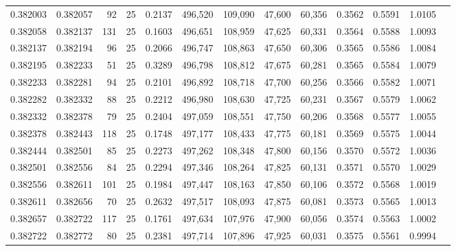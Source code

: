 \begin{tabular}{rrrrrrrrrrrrr}
0.382003 & 0.382057 &    92 &  25 &                                     0.2137 & 496,520 & 109,090 &  47,600 &  60,356 & 0.3562 & 0.5591 & 1.0105 \\
0.382058 & 0.382137 &   131 &  25 &                                     0.1603 & 496,651 & 108,959 &  47,625 &  60,331 & 0.3564 & 0.5588 & 1.0093 \\
0.382137 & 0.382194 &    96 &  25 &                                     0.2066 & 496,747 & 108,863 &  47,650 &  60,306 & 0.3565 & 0.5586 & 1.0084 \\
0.382195 & 0.382233 &    51 &  25 &                                     0.3289 & 496,798 & 108,812 &  47,675 &  60,281 & 0.3565 & 0.5584 & 1.0079 \\
0.382233 & 0.382281 &    94 &  25 &                                     0.2101 & 496,892 & 108,718 &  47,700 &  60,256 & 0.3566 & 0.5582 & 1.0071 \\
0.382282 & 0.382332 &    88 &  25 &                                     0.2212 & 496,980 & 108,630 &  47,725 &  60,231 & 0.3567 & 0.5579 & 1.0062 \\
0.382332 & 0.382378 &    79 &  25 &                                     0.2404 & 497,059 & 108,551 &  47,750 &  60,206 & 0.3568 & 0.5577 & 1.0055 \\
0.382378 & 0.382443 &   118 &  25 &                                     0.1748 & 497,177 & 108,433 &  47,775 &  60,181 & 0.3569 & 0.5575 & 1.0044 \\
0.382444 & 0.382501 &    85 &  25 &                                     0.2273 & 497,262 & 108,348 &  47,800 &  60,156 & 0.3570 & 0.5572 & 1.0036 \\
0.382501 & 0.382556 &    84 &  25 &                                     0.2294 & 497,346 & 108,264 &  47,825 &  60,131 & 0.3571 & 0.5570 & 1.0029 \\
0.382556 & 0.382611 &   101 &  25 &                                     0.1984 & 497,447 & 108,163 &  47,850 &  60,106 & 0.3572 & 0.5568 & 1.0019 \\
0.382611 & 0.382656 &    70 &  25 &                                     0.2632 & 497,517 & 108,093 &  47,875 &  60,081 & 0.3573 & 0.5565 & 1.0013 \\
0.382657 & 0.382722 &   117 &  25 &                                     0.1761 & 497,634 & 107,976 &  47,900 &  60,056 & 0.3574 & 0.5563 & 1.0002 \\
0.382722 & 0.382772 &    80 &  25 &                                     0.2381 & 497,714 & 107,896 &  47,925 &  60,031 & 0.3575 & 0.5561 & 0.9994 \\

\end{tabular}
